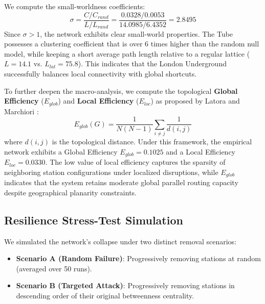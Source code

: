 \documentclass[12pt, a4paper]{article}
\begin{document}
\begin{table}[htbp]
\centering
\caption{Small-World Metric Comparisons}
\label{tab:smallworld}
\end{table}

We compute the small-worldness coefficients:
\begin{equation}
    \sigma = \frac{C / C_{rand}}{L / L_{rand}} = \frac{0.0328 / 0.0053}{14.0985 / 6.4352} = 2.8495
\end{equation}
Since $\sigma > 1$, the network exhibits clear small-world properties. The Tube possesses a clustering coefficient that is over 6 times higher than the random null model, while keeping a short average path length relative to a regular lattice ($L = 14.1$ vs. $L_{lat} = 75.8$). This indicates that the London Underground successfully balances local connectivity with global shortcuts.

To further deepen the macro-analysis, we compute the topological \textbf{Global Efficiency} ($E_{glob}$) and \textbf{Local Efficiency} ($E_{loc}$) as proposed by Latora and Marchiori \cite{latora2001, latora2002}:
\begin{equation}
    E_{glob}(G) = \frac{1}{N(N-1)} \sum_{i \neq j} \frac{1}{d(i, j)}
\end{equation}
where $d(i,j)$ is the topological distance. Under this framework, the empirical network exhibits a Global Efficiency $E_{glob} = 0.1025$ and a Local Efficiency $E_{loc} = 0.0330$. The low value of local efficiency captures the sparsity of neighboring station configurations under localized disruptions, while $E_{glob}$ indicates that the system retains moderate global parallel routing capacity despite geographical planarity constraints.

\subsection{Resilience Stress-Test Simulation}
We simulated the network's collapse under two distinct removal scenarios:
\begin{itemize}
    \item \textbf{Scenario A (Random Failure)}: Progressively removing stations at random (averaged over 50 runs).
    \item \textbf{Scenario B (Targeted Attack)}: Progressively removing stations in descending order of their original betweenness centrality.
\end{itemize}
\end{document}
